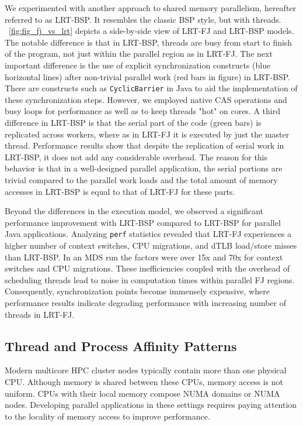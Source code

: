 \documentclass[10pt, conference, compsocconf]{IEEEtran}
\begin{document}
We experimented with another approach to shared memory parallelism, hereafter referred to as \ac{LRT-BSP}. It resembles the classic \ac{BSP} style, but with threads. \figurename~\ref{fig:fig_fj_vs_lrt} depicts a side-by-side view of \ac{LRT-FJ} and \ac{LRT-BSP} models. The notable difference is that in \ac{LRT-BSP}, threads are busy from start to finish of the program, not just within the parallel region as in \ac{LRT-FJ}. The next important difference is the use of explicit synchronization constructs (blue horizontal lines) after non-trivial parallel work (red bars in figure) in \ac{LRT-BSP}. There are constructs such as \texttt{CyclicBarrier} in Java to aid the implementation of these synchronization steps. However, we employed native \ac{CAS} operations and busy loops for performance as well as to keep threads "hot" on cores.  A third difference in \ac{LRT-BSP} is that the serial part of the code (green bars) is replicated across workers, where as in \ac{LRT-FJ} it is executed by just the master thread. Performance results show that despite the replication of serial work in \ac{LRT-BSP}, it does not add any considerable overhead. The reason for this behavior is that in a well-designed parallel application, the serial portions are trivial compared to the parallel work loads and the total amount of memory accesses in \ac{LRT-BSP} is equal to that of \ac{LRT-FJ} for these parts. 

Beyond the differences in the execution model, we observed a significant performance improvement with \ac{LRT-BSP} compared to \ac{LRT-BSP} for parallel Java applications. Analyzing \texttt{perf} statistics revealed that \ac{LRT-FJ} experiences a higher number of context switches, \acs{CPU} migrations, and \ac{dTLB} load/store misses than \ac{LRT-BSP}. In an \ac{MDS} run the factors were over 15x and 70x for context switches and \acs{CPU} migrations. These inefficiencies coupled with the overhead of scheduling threads lead to noise in computation times within parallel \ac{FJ} regions. Consequently, synchronization points become immensely expensive, where performance results indicate degrading performance with increasing number of threads in \ac{LRT-FJ}.


\subsection{Thread and Process Affinity Patterns}
Modern multicore \ac{HPC} cluster nodes typically contain more than one physical \acs{CPU}. Although memory is shared between these \acp{CPU}, memory access is not uniform. \acp{CPU} with their local memory compose \ac{NUMA} domains or \ac{NUMA} nodes. Developing parallel applications in these settings requires paying attention to the locality of memory access to improve performance.
\end{document}
